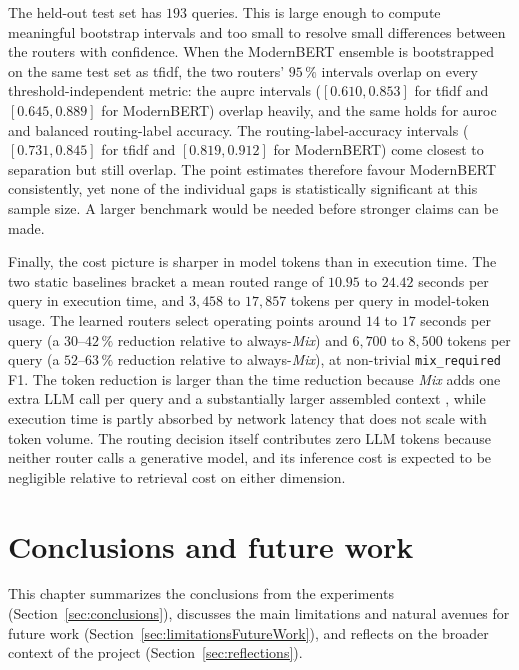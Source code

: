\documentclass[english, bibtex]{kththesis}               %
\numberwithin{listing}{chapter}
\begin{document}
The held-out test set has $193$ queries. This is large enough to compute meaningful bootstrap intervals and too small to resolve small differences between the routers with confidence. When the ModernBERT ensemble is bootstrapped on the same test set as \gls{tfidf}, the two routers' $95\,\%$ intervals overlap on every threshold-independent metric: the \gls{auprc} intervals ($[0.610, 0.853]$ for \gls{tfidf} and $[0.645, 0.889]$ for ModernBERT) overlap heavily, and the same holds for \gls{auroc} and balanced routing-label accuracy. The routing-label-accuracy intervals ($[0.731, 0.845]$ for \gls{tfidf} and $[0.819, 0.912]$ for ModernBERT) come closest to separation but still overlap. The point estimates therefore favour ModernBERT consistently, yet none of the individual gaps is statistically significant at this sample size. A larger benchmark would be needed before stronger claims can be made.

Finally, the cost picture is sharper in model tokens than in execution time. The two static baselines bracket a mean routed range of $10.95$ to $24.42$ seconds per query in execution time, and $3{,}458$ to $17{,}857$ tokens per query in model-token usage. The learned routers select operating points around $14$ to $17$ seconds per query (a $30$--$42\,\%$ reduction relative to always-\emph{Mix}) and $6{,}700$ to $8{,}500$ tokens per query (a $52$--$63\,\%$ reduction relative to always-\emph{Mix}), at non-trivial \texttt{mix\_required} F1. The token reduction is larger than the time reduction because \emph{Mix} adds one extra LLM call per query and a substantially larger assembled context \cite{lightrag2024,microsoft2024graphragcosts}, while execution time is partly absorbed by network latency that does not scale with token volume. The routing decision itself contributes zero LLM tokens because neither router calls a generative model, and its inference cost is expected to be negligible relative to retrieval cost on either dimension.

\cleardoublepage
\chapter{Conclusions and future work}
\label{ch:conclusionsAndFutureWork}

This chapter summarizes the conclusions from the experiments (Section~\ref{sec:conclusions}), discusses the main limitations and natural avenues for future work (Section~\ref{sec:limitationsFutureWork}), and reflects on the broader context of the project (Section~\ref{sec:reflections}).
\end{document}
